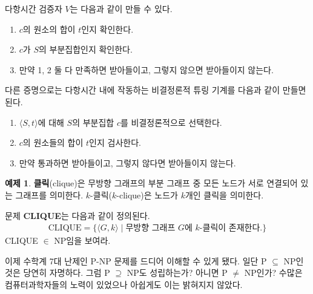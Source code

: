 \documentclass[b5paper]{book}
\theoremstyle{definition}
\newtheorem{ex}{예제}[chapter]
\newenvironment{pf*}{\pushQED{\qed}\pf}{\popQED\endpf}
\begin{document}
\begin{pf*}
    다항시간 검증자 $V$는 다음과 같이 만들 수 있다.
    \begin{enumerate}
        \item $c$의 원소의 합이 $t$인지 확인한다.
        \item $c$가 $S$의 부분집합인지 확인한다.
        \item 만약 1, 2 둘 다 만족하면 받아들이고, 그렇지 않으면 받아들이지 않는다.
    \end{enumerate}
    다른 증명으로는 다항시간 내에 작동하는 비결정론적 튜링 기계를 다음과 같이 만들면 된다.
    \begin{enumerate}
        \item $\langle S, t \rangle$에 대해 $S$의 부분집합 $c$를 비결정론적으로 선택한다.
        \item $c$의 원소들의 합이 $t$인지 검사한다.
        \item 만약 통과하면 받아들이고, 그렇지 않다면 받아들이지 않는다. 
    \end{enumerate}
\end{pf*}
\begin{ex}
    \textbf{클릭}(clique)은 무방향 그래프의 부분 그래프 중 모든 노드가 서로 연결되어 있는 그래프를 의미한다.
    $k$-클릭($k$-clique)은 노드가 $k$개인 클릭을 의미한다.
\begin{figure}[!ht]
    \centering
    \caption{}
\end{figure}
문제 \textbf{CLIQUE}는 다음과 같이 정의된다.
\begin{align*}
    \text{CLIQUE} = \{ \langle G , k \rangle \;\vert\; \text{무방향 그래프 } 
    G\text{에 }k\text{-클릭이 존재한다.}\}
\end{align*}
CLIQUE $\in$ NP임을 보여라.
\end{ex}
이제 수학계 7대 난제인 P-NP 문제를 드디어 이해할 수 있게 됐다. 
일단 P $\subseteq$ NP인 것은 당연히 자명하다. 그럼 P $\supseteq$ NP도 성립하는가? 아니면
P $\neq$ NP인가? 수많은 컴퓨터과학자들의 노력이 있었으나 아쉽게도 이는 밝혀지지 않았다. 
\end{document}
